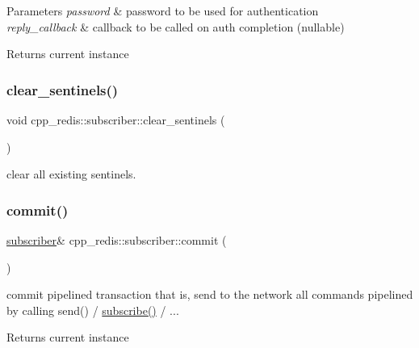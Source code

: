 \begin{DoxyParams}{Parameters}
{\em password} & password to be used for authentication \\
\hline
{\em reply\+\_\+callback} & callback to be called on auth completion (nullable) \\
\hline
\end{DoxyParams}
\begin{DoxyReturn}{Returns}
current instance 
\end{DoxyReturn}
\mbox{\label{classcpp__redis_1_1subscriber_a3f8119bc43a67f8e22369aad529444ba}} 
\subsubsection{\texorpdfstring{clear\+\_\+sentinels()}{clear\_sentinels()}}
{\footnotesize\ttfamily void cpp\+\_\+redis\+::subscriber\+::clear\+\_\+sentinels (\begin{DoxyParamCaption}{ }\end{DoxyParamCaption})}

clear all existing sentinels. \mbox{\label{classcpp__redis_1_1subscriber_af78a5542315daac42998809eeec30eef}} 
\subsubsection{\texorpdfstring{commit()}{commit()}}
{\footnotesize\ttfamily \mbox{\hyperlink{classcpp__redis_1_1subscriber}{subscriber}}\& cpp\+\_\+redis\+::subscriber\+::commit (\begin{DoxyParamCaption}{ }\end{DoxyParamCaption})}

commit pipelined transaction that is, send to the network all commands pipelined by calling send() / \mbox{\hyperlink{classcpp__redis_1_1subscriber_afee579c702182041645a3d3c55de4b9e}{subscribe()}} / ...

\begin{DoxyReturn}{Returns}
current instance 
\end{DoxyReturn}
\mbox{\label{classcpp__redis_1_1subscriber_a6ae8134a9a9b31d6f2434ec4f6e86d3a}} 
